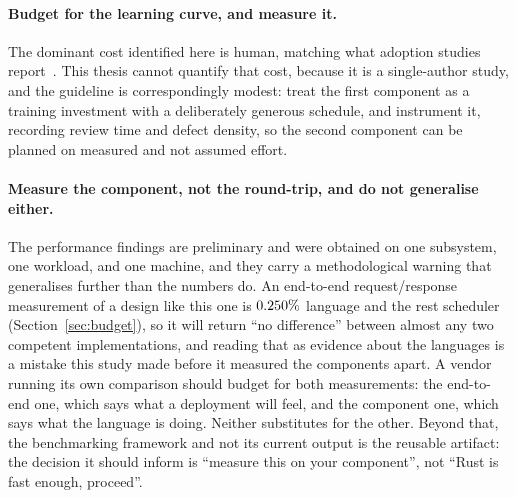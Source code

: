 \documentclass[english,twoside,openright,a4paper,censored,csm,software-track-2020]{HYthesisML}
\begin{document}
\paragraph{Budget for the learning curve, and measure it.}
The dominant cost identified here is human, matching what adoption studies
report~\cite{fulton2021adopting}. This thesis cannot quantify that cost, because it is a
single-author study, and the guideline is correspondingly modest: treat the first component as
a training investment with a deliberately generous schedule, and instrument it, recording
review time and defect density, so the second component can be planned on measured and not
assumed effort.

\paragraph{Measure the component, not the round-trip, and do not generalise either.}
The performance findings are preliminary and were obtained on one subsystem, one workload, and
one machine, and they carry a methodological warning that generalises further than the numbers
do. An end-to-end request/response measurement of a design like this one is
$0.250\%$ language and the rest scheduler
(Section~\ref{sec:budget}), so it will return ``no difference'' between almost any two
competent implementations, and reading that as evidence about the languages is a mistake this
study made before it measured the components apart. A vendor running its own comparison should
budget for both measurements: the end-to-end one, which says what a deployment will feel, and
the component one, which says what the language is doing. Neither substitutes for the other.
Beyond that, the benchmarking framework and not its current output is the reusable
artifact: the decision it should inform is ``measure this on your component'', not ``Rust is
fast enough, proceed''.
\end{document}
